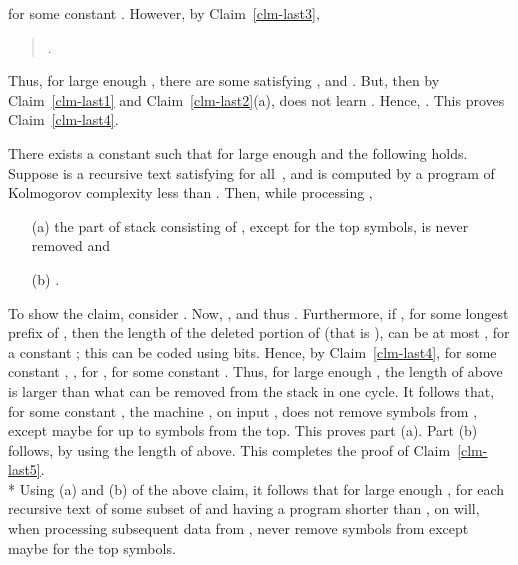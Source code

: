 \documentclass{LMCS}
\theoremstyle{plain}\newtheorem{athm}[thm]{Theorem}
\theoremstyle{plain}\newtheorem{aprop}[thm]{Proposition}
\theoremstyle{plain}\newtheorem{aprob}[thm]{Open Problem}
\theoremstyle{plain}\newtheorem{acor}[thm]{Corollary}
\theoremstyle{plain}\newtheorem{alem}[thm]{Lemma}
\theoremstyle{definition}\newtheorem{adefn}[thm]{Definition}
\theoremstyle{definition}\newtheorem{arem}[thm]{Remark}
\theoremstyle{plain}\newtheorem{aexmp}[thm]{Example}
\theoremstyle{plain}\newtheorem{aclm}[thm]{Claim}
\def\sp{\\*\indent}
\begin{document}
for some constant .
However, by Claim~\ref{clm-last3}, 
\begin{quote}
  .
\end{quote}
Thus, for large enough ,
there are some  satisfying ,
 and
. But, then
by Claim~\ref{clm-last1} and Claim~\ref{clm-last2}(a), 
 does not learn .
Hence, .
This proves Claim~\ref{clm-last4}.

\begin{clm}\label{clm-last5}
There exists a constant  such that
for large enough  and  the following holds. 
Suppose  is a recursive text 
satisfying  for all~, and 
is computed by a program of Kolmogorov complexity less than .
Then, while processing ,
\begin{enumerate}[(a)]
\item[(a)] the part of stack consisting of , except for the top 
 symbols, is never removed and
\item[(b)] .
\end{enumerate}
\end{clm}

\noindent
To show the claim, consider .
Now, , and 
thus .
Furthermore, if , for some longest prefix  of , then
the length of the deleted portion of  (that is ),
can be at most , for a constant ;
this can be coded using  bits.
Hence, by Claim~\ref{clm-last4}, for some constant , , for , for some constant .
Thus, for large enough , the length of  above 
is larger than what can be removed from the stack in one cycle.
It follows that, for some constant , 
the machine , on input ,
does not remove symbols from ,
except maybe for up to  symbols from the top.
This proves part (a). Part (b) follows, by using the length of 
above. This completes the proof of Claim~\ref{clm-last5}.
\sp
Using (a) and (b) of the above claim, it follows that
for large enough ,
for each recursive text  of some subset of  and
 having a program shorter than , 
 on  will, when processing subsequent data
from , never remove symbols from  except maybe for the
top  symbols.
\end{document}
